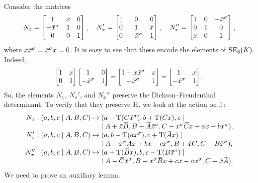 Consider the matrices
\begin{equation}
	N_x = \begin{bmatrix}
		1 & x & 0 \\
		-\ovx^{\s} & 1 & 0 \\
		0 & 0 & 1
	\end{bmatrix},\quad
	N_x' = \begin{bmatrix}
		1 & 0 & 0 \\
		0 & 1 & x \\
		0 & -\ovx^{\s} & 1
	\end{bmatrix},\quad
	N_x'' = \begin{bmatrix}
		1 & 0 & -\ovx^{\s} \\
		0 & 1 & 0 \\
		x & 0 & 1
	\end{bmatrix},
\end{equation}
where $x\ovx^{\s} = \ovx^{\s}x = 0$. 
It is easy to see that these encode the elements of $\mathrm{SE}_6(K)$. Indeed,
\begin{equation}
	\begin{bmatrix}
		1 & x \\
		0 & 1
	\end{bmatrix}
	\begin{bmatrix}
		1 & 0 \\
		-\ovx ^{\s} & 1
	\end{bmatrix} = 
	\begin{bmatrix}
		1 - x\ovx ^{\s} & x \\
		-\ovx ^{\s} & 1 
	\end{bmatrix} = 
	\begin{bmatrix}
		1 & x \\
		-\ovx ^{\s} & 1
	\end{bmatrix}.
\end{equation}
So, the elements $N_x$, $N_x'$, and $N_x''$ preserve the Dickson--Freudenthal determinant. 
To verify that they preserve $\mathrm{H}$, we look at the action on $\mathbb{J}$:
\begin{equation}
	\label{eq:3_nx_image}
	\begin{array}{r@{\;}c@{\;}l}
		N_x: (a,b,c\mid A,B,C) & \mapsto &
		(a-\Tr(C\ovx ^{\s}), b+\Tr(\ovC x), c \mid \\
		& & \mid	A+\ovx \ovB , B-\ovA \ovx ^{\s},C-x^{\s}\ovC x+ax-bx^{\s}), \\
		
		N_x': (a,b,c\mid A,B,C) & \mapsto & 
		(a, b-\Tr(a\ovx^{\s}), c+\Tr(\ovA x) \mid \\
		& & \mid	A - x^{\s} \ovA x + bx-cx^{\s}, B + \ovx \ovC, C - \ovB \ovx^{\s}), \\
		
		N_x'': (a,b,c\mid A,B,C) & \mapsto &
		(a+\Tr(\ovB x), b, c-\Tr(B\ovx^{\s}) \mid \\
		& & \mid 	A-\ovC\ovx^{\s}, B-x^{\s}\ovB x + cx - ax^{\s}, C+\ovx\ovA).
	\end{array}
\end{equation}
We need to prove an auxiliary lemma.

